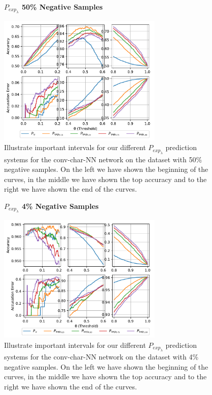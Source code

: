 \begin{description}
        \begin{figure}
            \centering
            \textbf{$P_{exp_\lambda}$ 50\% Negative Samples}\par\medskip
            \includegraphics[width=0.7\textwidth]{./pictures/discussion/conv_char_nn_prediction_zoom_50_time}

            \caption{Illustrate important intervals for our different
            $P_{exp_\lambda}$ prediction systems for the \gls{conv-char-NN}
            network on the dataset with 50\% negative samples. On the left we
            have shown the beginning of the curves, in the middle we have shown
            the top accuracy and to the right we have shown the end of the
            curves.}
            \label{fig:conv_char_prediction_zoom_50}
        \end{figure}

        \begin{figure}
            \centering
            \textbf{$P_{exp_\lambda}$ 4\% Negative Samples}\par\medskip
            \includegraphics[width=0.7\textwidth]{./pictures/discussion/conv_char_nn_prediction_zoom_04_time}
            \caption{Illustrate important intervals for our different
            $P_{exp_\lambda}$ prediction systems for the \gls{conv-char-NN}
            network on the dataset with 4\% negative samples. On the left we
            have shown the beginning of the curves, in the middle we have shown
            the top accuracy and to the right we have shown the end of the
            curves.}
            \label{fig:conv_char_prediction_zoom_04}
        \end{figure}


\end{description}
